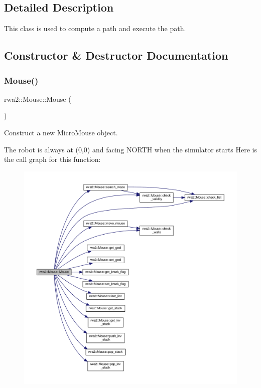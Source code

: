 \subsection{Detailed Description}
This class is used to compute a path and execute the path. 

\subsection{Constructor \& Destructor Documentation}
\mbox{\label{classrwa2_1_1_mouse_a048dffae3aaa3a6ddc2c6cc4741a097c}} 
\subsubsection{\texorpdfstring{Mouse()}{Mouse()}}
{\footnotesize\ttfamily rwa2\+::\+Mouse\+::\+Mouse (\begin{DoxyParamCaption}{ }\end{DoxyParamCaption})\hspace{0.3cm}{\ttfamily [inline]}}



Construct a new Micro\+Mouse object. 

The robot is always at (0,0) and facing N\+O\+R\+TH when the simulator starts Here is the call graph for this function\+:\nopagebreak
\begin{figure}[H]
\begin{center}
\leavevmode
\includegraphics[width=350pt]{classrwa2_1_1_mouse_a048dffae3aaa3a6ddc2c6cc4741a097c_cgraph}
\end{center}
\end{figure}


